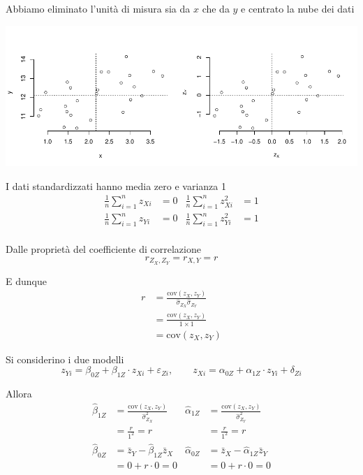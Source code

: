 \documentclass[
  11pt,
]{book}
\theoremstyle{mytheoremstyle}
\theoremstyle{mydefstyle}
\begin{document}
Abbiamo eliminato l'unità di misura sia da \(x\) che da \(y\) e centrato la nube dei dati

\begin{center}\includegraphics{Appunti_di_Statistica_2025_files/figure-latex/18-regressione-II-32-1} \end{center}

I dati standardizzati hanno media zero e varianza 1
\[\begin{aligned}
\frac 1 n \sum_{i=1}^n z_{Xi} &=0 & \frac 1 n \sum_{i=1}^n z_{Xi}^2 &=1\\
\frac 1 n \sum_{i=1}^n z_{Yi} &=0 & \frac 1 n \sum_{i=1}^n z_{Yi}^2 &=1\\
\end{aligned}
\]

Dalle proprietà del coefficiente di correlazione
\[r_{Z_X,Z_Y}=r_{X,Y}=r\]

E dunque
\[\begin{aligned}
r &=\frac{\text{cov}(z_X,z_Y)}{\hat\sigma_{Z_X}\hat\sigma_{Z_Y}}\\
 &= \frac{\text{cov}(z_X,z_Y)}{1\times 1}\\
 &= \text{cov}(z_X,z_Y)
\end{aligned}
\]

Si considerino i due modelli
\[z_{Yi}=\beta_{0Z}+\beta_{1Z}\cdot z_{Xi}+\varepsilon_{Zi}, \qquad z_{Xi}=\alpha_{0Z}+\alpha_{1Z}\cdot z_{Yi}+\delta_{Zi}\]

Allora
\[\begin{aligned}
\hat\beta_{1Z} &=\frac{\text{cov}(z_X,z_Y)}{\hat\sigma^2_{Z_X}} & \hat\alpha_{1Z} &=\frac{\text{cov}(z_X,z_Y)}{\hat\sigma^2_{Z_Y}}\\
 &=\frac{r}{1^2}=r & &=\frac{r}{1^2}=r\\
\hat\beta_{0Z} &=\bar z_{Y} - \hat\beta_{1Z} \bar z_X &\hat\alpha_{0Z} &=\bar z_X - \hat\alpha_{1Z} \bar z_Y\\
 &=  0 + r \cdot 0 =0 & &=  0 + r \cdot 0 =0
\end{aligned}
\]
\end{document}
